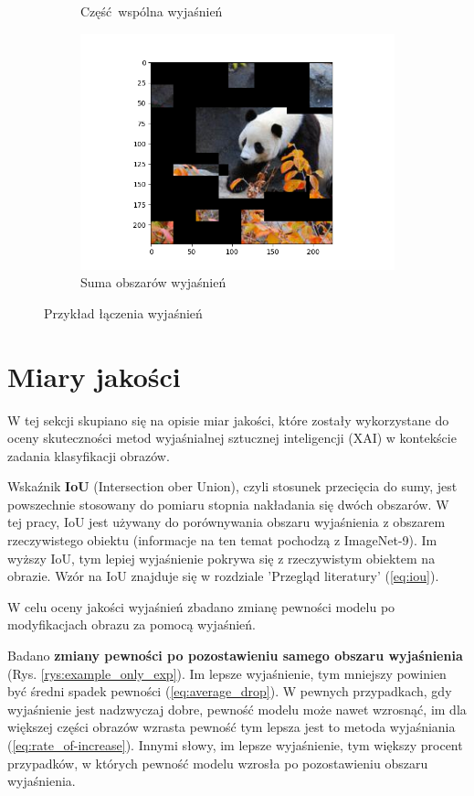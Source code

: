 \begin{figure}[!h]
\begin{subfigure}[b]{0.45\textwidth}
		\caption{Część wspólna wyjaśnień}  \label{rys:example_combine_and}
	\end{subfigure}
	\begin{subfigure}[b]{0.45\textwidth}
		\centering\includegraphics[width=.9\textwidth]{img/examples/or_explanation}
		\caption{Suma obszarów wyjaśnień}  \label{rys:example_combine_or}
	\end{subfigure}
	\caption{Przykład łączenia wyjaśnień}
\end{figure}

\section*{Miary jakości}

W tej sekcji skupiano się na opisie miar jakości, które zostały wykorzystane do oceny skuteczności metod wyjaśnialnej sztucznej inteligencji (XAI) w kontekście zadania klasyfikacji obrazów.

Wskaźnik \textbf{IoU} (Intersection ober Union), czyli stosunek przecięcia do sumy, jest powszechnie stosowany do pomiaru stopnia nakładania się dwóch obszarów.
W tej pracy, IoU jest używany do porównywania obszaru wyjaśnienia z obszarem rzeczywistego obiektu (informacje na ten temat pochodzą z ImageNet-9).
Im wyższy IoU, tym lepiej wyjaśnienie pokrywa się z rzeczywistym obiektem na obrazie.
Wzór na IoU znajduje się w rozdziale 'Przegląd literatury' (\ref{eq:iou}).

W celu oceny jakości wyjaśnień zbadano zmianę pewności modelu po modyfikacjach obrazu za pomocą wyjaśnień.

Badano \textbf{zmiany pewności po pozostawieniu samego obszaru wyjaśnienia} (Rys. \ref{rys:example_only_exp}).
Im lepsze wyjaśnienie, tym mniejszy powinien być średni spadek pewności (\ref{eq:average_drop}).
W pewnych przypadkach, gdy wyjaśnienie jest nadzwyczaj dobre, pewność modelu może nawet wzrosnąć, im dla większej części obrazów wzrasta pewność tym lepsza jest to metoda wyjaśniania (\ref{eq:rate_of-increase}).
Innymi słowy, im lepsze wyjaśnienie, tym większy procent przypadków, w których pewność modelu wzrosła po pozostawieniu obszaru wyjaśnienia.

